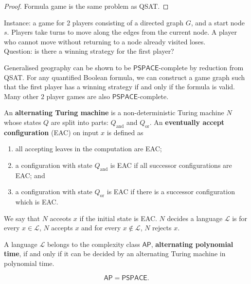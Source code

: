 \begin{proof}
	Formula game is the same problem as QSAT.
\end{proof}

\begin{problem}
	Instance: a game for 2 players consisting of a directed graph $G$,
	and a start node $s$.
	Players take turns to move along the edges from the current node.
	A player who cannot move without returning to a node already visited loses.
	\\
	Question: is there a winning strategy for the first player?
\end{problem}

Generalised geography can be shown to be $\mathsf{PSPACE}$-complete by
reduction from QSAT.
For any quantified Boolean formula, we can construct a game graph
such that the first player has a winning strategy if and only if the formula
is valid.
Many other $2$ player games are also $\mathsf{PSPACE}$-complete.

\begin{definition}
	An \textbf{alternating Turing machine} is a non-deterministic Turing machine
	$N$ whose states $Q$ are split into parts: $Q_\text{and}$ and $Q_\text{or}$.
	An \textbf{eventually accept configuration} (EAC) on input $x$ is defined
	as
	\begin{enumerate}
		\item all accepting leaves in the computation are EAC;
		\item a configuration with state $Q_\text{and}$ is EAC if all
			successor configurations are  EAC; and
		\item a configuration with state $Q_\text{or}$ is EAC if there is a
			successor configuration which is EAC.
	\end{enumerate}
	We say that $N$ acceots $x$ if the initial state is EAC.
	$N$ decides a language $\mathcal L$ is for every $x \in \mathcal L$,
	$N$ accepts $x$ and for every $x \not\in \mathcal L$, $N$ rejects $x$.
\end{definition}

\begin{definition}
	A language $\mathcal L$ belongs to the complexity class
	$\mathsf{AP}$, \textbf{alternating polynomial time},
	if and only if it can be decided by an alternating Turing machine
	in polynomial time.
\end{definition}

\begin{theorem}[]
	\hfill
	\vspace{-\baselineskip}
	\[
		\mathsf{AP} = \mathsf{PSPACE}.
	\]
\end{theorem}


